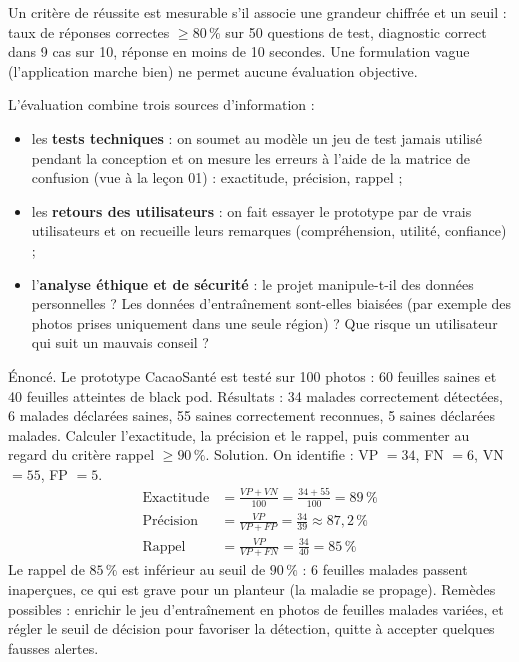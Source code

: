 \documentclass[11pt]{article}
\newcommand{\cle}[1]{{\popxbold\color{popdark}#1}}
\newcounter{popsec}
\newcounter{popsub}
\newcommand{\courssub}[1]{%
  \stepcounter{popsub}%
  \par\vspace{9pt}\noindent{\popxbold\fontsize{11.5}{13}\selectfont\color{popink}{\color{poporange}\thepopsec.\thepopsub}\hspace{6pt}#1}\par\nopagebreak\vspace{4pt}
}
\begin{document}
\courssub{Évaluer la solution}

\begin{definition}
Un critère de réussite est \cle{mesurable} s'il associe une grandeur chiffrée et un seuil : \og taux de réponses correctes $\geq 80\,\%$ sur 50 questions de test\fg{}, \og diagnostic correct dans 9 cas sur 10\fg{}, \og réponse en moins de 10 secondes\fg{}. Une formulation vague (\og l'application marche bien\fg{}) ne permet aucune évaluation objective.
\end{definition}

L'évaluation combine trois sources d'information :
\begin{itemize}
\item les \textbf{tests techniques} : on soumet au modèle un jeu de test jamais utilisé pendant la conception et on mesure les erreurs à l'aide de la \cle{matrice de confusion} (vue à la leçon 01) : exactitude, précision, rappel ;
\item les \textbf{retours des utilisateurs} : on fait essayer le prototype par de vrais utilisateurs et on recueille leurs remarques (compréhension, utilité, confiance) ;
\item l'\textbf{analyse éthique et de sécurité} : le projet manipule-t-il des données personnelles ? Les données d'entraînement sont-elles biaisées (par exemple des photos prises uniquement dans une seule région) ? Que risque un utilisateur qui suit un mauvais conseil ?
\end{itemize}

\begin{exoresolu}
Énoncé. Le prototype \og CacaoSanté\fg{} est testé sur 100 photos : 60 feuilles saines et 40 feuilles atteintes de black pod. Résultats : 34 malades correctement détectées, 6 malades déclarées saines, 55 saines correctement reconnues, 5 saines déclarées malades. Calculer l'exactitude, la précision et le rappel, puis commenter au regard du critère \og rappel $\geq 90\,\%$\fg{}.
\tcblower
Solution. On identifie : VP $= 34$, FN $= 6$, VN $= 55$, FP $= 5$.
\begin{align*}
\text{Exactitude} &= \frac{VP + VN}{100} = \frac{34 + 55}{100} = 89\,\% \\
\text{Pr\'ecision} &= \frac{VP}{VP + FP} = \frac{34}{39} \approx 87{,}2\,\% \\
\text{Rappel} &= \frac{VP}{VP + FN} = \frac{34}{40} = 85\,\%
\end{align*}
Le rappel de $85\,\%$ est inférieur au seuil de $90\,\%$ : 6 feuilles malades passent inaperçues, ce qui est grave pour un planteur (la maladie se propage). Remèdes possibles : enrichir le jeu d'entraînement en photos de feuilles malades variées, et régler le seuil de décision pour favoriser la détection, quitte à accepter quelques fausses alertes.
\end{exoresolu}
\end{document}
